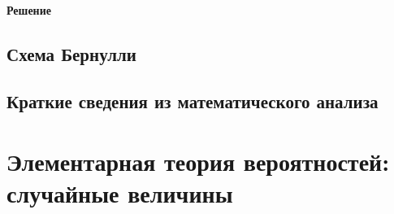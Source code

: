 \documentclass[a4paper,12pt]{article}
\begin{document}
\paragraph{Решение}


\subsection{Схема Бернулли}
\subsection{Краткие сведения из математического анализа}


\section{Элементарная теория вероятностей: случайные величины}
\end{document}
